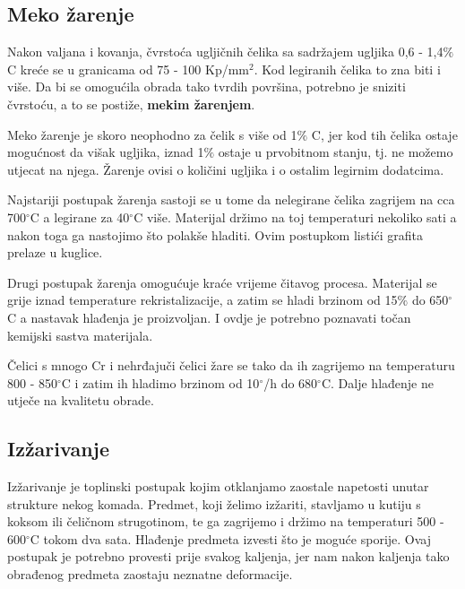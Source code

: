\documentclass[a4paper,12pt]{article}
\numberwithin{figure}{section}
\begin{document}
\subsection{Meko žarenje}
Nakon valjana i kovanja, čvrstoća ugljičnih čelika sa sadržajem ugljika 0,6 - 1,4$\%$C kreće se u granicama od 75 - 100 Kp/mm$^{2}$. Kod legiranih čelika to zna biti i više. Da bi se omogućila obrada tako tvrdih površina, potrebno je sniziti čvrstoću, a to se postiže, \textbf{mekim žarenjem}.\par
Meko žarenje je skoro neophodno za čelik s više od 1$\%$ C, jer kod tih čelika ostaje mogućnost da višak ugljika, iznad 1$\%$ ostaje u prvobitnom stanju, tj. ne možemo utjecat na njega. Žarenje ovisi o količini ugljika i o ostalim legirnim dodatcima.\par 
Najstariji postupak žarenja sastoji se u tome da nelegirane čelika zagrijem na cca 700$^{\circ}$C a legirane za 40$^{\circ}$C više. Materijal držimo na toj temperaturi nekoliko sati a nakon toga ga nastojimo što polakše hladiti. Ovim postupkom listići grafita prelaze u kuglice. \par
Drugi postupak žarenja omogućuje kraće vrijeme čitavog procesa. Materijal se grije iznad temperature rekristalizacije, a zatim se hladi brzinom od 15$\%$ do 650$^{\circ}$C a nastavak hlađenja je proizvoljan. I ovdje je potrebno poznavati točan kemijski sastva materijala.\par
Čelici s mnogo Cr i nehrđajuči čelici žare se tako da ih zagrijemo na temperaturu 800 - 850$^{\circ}$C  i zatim ih hladimo brzinom od 10$^{\circ}$/h do 680$^{\circ}$C. Dalje hlađenje ne utječe na kvalitetu obrade.
\subsection{Izžarivanje}
Izžarivanje je toplinski postupak kojim otklanjamo zaostale napetosti unutar strukture nekog komada. Predmet, koji želimo izžariti, stavljamo u kutiju s koksom ili čeličnom strugotinom, te ga zagrijemo i držimo na temperaturi 500 - 600$^{\circ}$C  tokom dva sata. Hlađenje predmeta izvesti što je moguće sporije. Ovaj postupak je potrebno provesti prije svakog kaljenja, jer nam nakon kaljenja tako obrađenog predmeta zaostaju neznatne deformacije.
\end{document}

